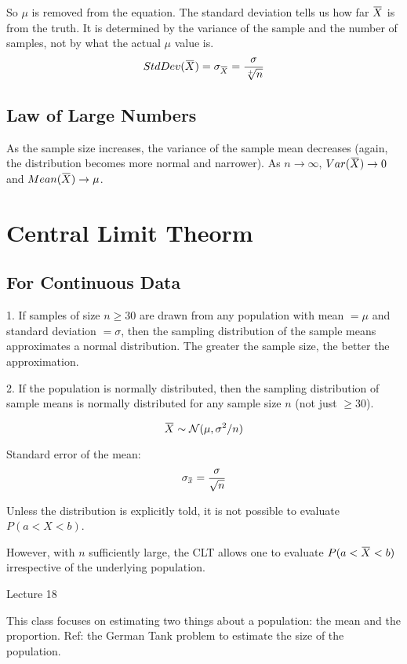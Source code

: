 \documentclass[11pt, oneside]{article}   	%
\newcommand{\overbar}[1]{\mkern 1.5mu\overline{\mkern-1.5mu#1\mkern-1.5mu}\mkern 1.5mu}
\begin{document}
So $\mu$ is removed from the equation.  The standard deviation tells us how far $\overbar{X}$ is from the truth. It is determined by the variance of the sample and the number of samples, not by what the actual $\mu$ value is.
\[
StdDev(\overbar{X}) = \sigma_{\overbar{X}} = \frac{\sigma}{\sqrt[+]{n}}
\]

\subsection{Law of Large Numbers}

As the sample size increases, the variance of the sample mean decreases (again, the distribution becomes more normal and narrower). As $n \rightarrow \infty$, $Var(\overbar{X}) \rightarrow 0$ and $Mean(\overbar{X}) \rightarrow \mu$. 


\section{Central Limit Theorm}

\subsection{For Continuous Data}

1. If samples of size $n \geq 30$ are drawn from any population with mean $= \mu$ and standard deviation $= \sigma$, then the sampling distribution of the sample means approximates a normal distribution. The greater the sample size, the better the approximation.

2. If the population is normally distributed, then the sampling distribution of sample means is normally distributed for any sample size $n$ (not just $\geq 30$).

\[
\overbar{X} \sim \mathcal{N}(\mu, \sigma^2 / n)
\]

Standard error of the mean:
\[
\sigma_{\overbar{x}} = \frac{\sigma}{\sqrt{n}}
\]

Unless the distribution is explicitly told, it is not possible to evaluate $P(a < X < b)$.

However, with $n$ sufficiently large, the CLT allows one to evaluate $P(a < \overbar{X} < b)$ irrespective of the underlying population.

Lecture 18

This class focuses on estimating two things about a population: the mean and the proportion. Ref: the German Tank problem to estimate the size of the population.
\end{document}
